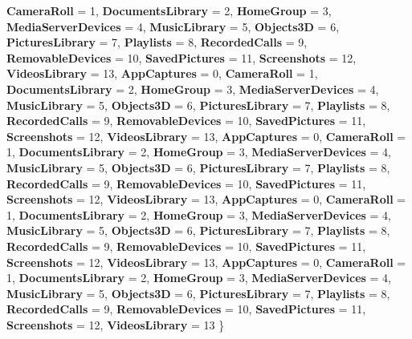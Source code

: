 \begin{DoxyCompactItemize}
{\bfseries Camera\+Roll} = 1, 
{\bfseries Documents\+Library} = 2, 
{\bfseries Home\+Group} = 3, 
\newline
{\bfseries Media\+Server\+Devices} = 4, 
{\bfseries Music\+Library} = 5, 
{\bfseries Objects3D} = 6, 
{\bfseries Pictures\+Library} = 7, 
\newline
{\bfseries Playlists} = 8, 
{\bfseries Recorded\+Calls} = 9, 
{\bfseries Removable\+Devices} = 10, 
{\bfseries Saved\+Pictures} = 11, 
\newline
{\bfseries Screenshots} = 12, 
{\bfseries Videos\+Library} = 13, 
{\bfseries App\+Captures} = 0, 
{\bfseries Camera\+Roll} = 1, 
\newline
{\bfseries Documents\+Library} = 2, 
{\bfseries Home\+Group} = 3, 
{\bfseries Media\+Server\+Devices} = 4, 
{\bfseries Music\+Library} = 5, 
\newline
{\bfseries Objects3D} = 6, 
{\bfseries Pictures\+Library} = 7, 
{\bfseries Playlists} = 8, 
{\bfseries Recorded\+Calls} = 9, 
\newline
{\bfseries Removable\+Devices} = 10, 
{\bfseries Saved\+Pictures} = 11, 
{\bfseries Screenshots} = 12, 
{\bfseries Videos\+Library} = 13, 
\newline
{\bfseries App\+Captures} = 0, 
{\bfseries Camera\+Roll} = 1, 
{\bfseries Documents\+Library} = 2, 
{\bfseries Home\+Group} = 3, 
\newline
{\bfseries Media\+Server\+Devices} = 4, 
{\bfseries Music\+Library} = 5, 
{\bfseries Objects3D} = 6, 
{\bfseries Pictures\+Library} = 7, 
\newline
{\bfseries Playlists} = 8, 
{\bfseries Recorded\+Calls} = 9, 
{\bfseries Removable\+Devices} = 10, 
{\bfseries Saved\+Pictures} = 11, 
\newline
{\bfseries Screenshots} = 12, 
{\bfseries Videos\+Library} = 13, 
{\bfseries App\+Captures} = 0, 
{\bfseries Camera\+Roll} = 1, 
\newline
{\bfseries Documents\+Library} = 2, 
{\bfseries Home\+Group} = 3, 
{\bfseries Media\+Server\+Devices} = 4, 
{\bfseries Music\+Library} = 5, 
\newline
{\bfseries Objects3D} = 6, 
{\bfseries Pictures\+Library} = 7, 
{\bfseries Playlists} = 8, 
{\bfseries Recorded\+Calls} = 9, 
\newline
{\bfseries Removable\+Devices} = 10, 
{\bfseries Saved\+Pictures} = 11, 
{\bfseries Screenshots} = 12, 
{\bfseries Videos\+Library} = 13, 
\newline
{\bfseries App\+Captures} = 0, 
{\bfseries Camera\+Roll} = 1, 
{\bfseries Documents\+Library} = 2, 
{\bfseries Home\+Group} = 3, 
\newline
{\bfseries Media\+Server\+Devices} = 4, 
{\bfseries Music\+Library} = 5, 
{\bfseries Objects3D} = 6, 
{\bfseries Pictures\+Library} = 7, 
\newline
{\bfseries Playlists} = 8, 
{\bfseries Recorded\+Calls} = 9, 
{\bfseries Removable\+Devices} = 10, 
{\bfseries Saved\+Pictures} = 11, 
\newline
{\bfseries Screenshots} = 12, 
{\bfseries Videos\+Library} = 13
 \}
\end{DoxyCompactItemize}
